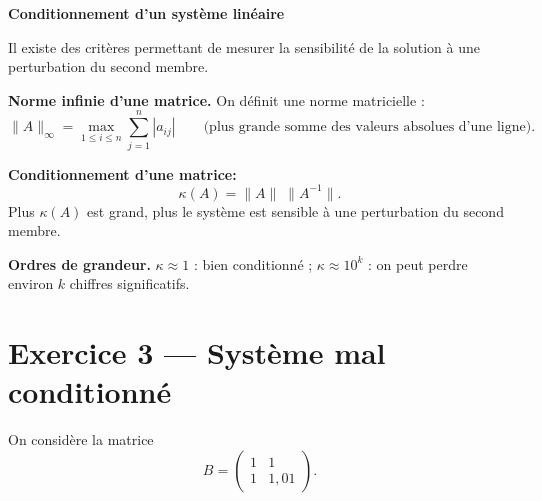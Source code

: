 
\begin{mdframed}[backgroundcolor=ThemeLight, linecolor=Theme,
  linewidth=1.5pt, innertopmargin=10pt, innerbottommargin=10pt]
\textbf{\large Conditionnement d'un système linéaire}

\medskip
Il existe des critères permettant de mesurer la sensibilité de la solution à une perturbation du second membre.

\textbf{Norme infinie d'une matrice.}
On définit une norme matricielle : 
\[
  \|A\|_{\infty}
  = \max_{1 \leq i \leq n}
    \sum_{j=1}^{n} |a_{ij}|
  \qquad
  \text{(plus grande somme des valeurs absolues d'une ligne).}
\]

\textbf{Conditionnement d'une matrice:}
\[
  \kappa(A)
  = \|A\|\;\|A^{-1}\|.
\]
Plus $\kappa(A)$ est grand, plus le système est sensible à une perturbation du second membre.


\textbf{Ordres de grandeur.}
$\kappa \approx 1$ : bien conditionné ;
$\kappa \approx 10^k$ : on peut perdre
environ $k$ chiffres significatifs.
\end{mdframed}

\vspace{2em}

\section*{Exercice 3 --- Système mal conditionné}

On considère la matrice
\[
  B = \begin{pmatrix}
    1 & 1\\
    1 & 1{,}01
  \end{pmatrix}.
\]

